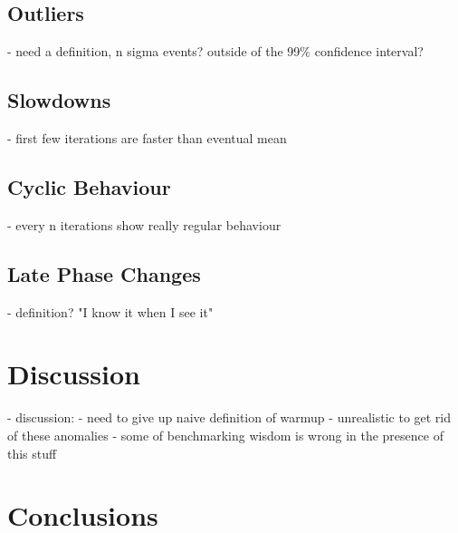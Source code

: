 \documentclass[10pt,preprint]{sigplanconf}
\begin{document}

\subsection{Outliers}
\label{sub:outliers}

 - need a definition, n sigma events? outside of the 99\% confidence interval?



\subsection{Slowdowns}
\label{sub:slowdowns}

 - first few iterations are faster than eventual mean



\subsection{Cyclic Behaviour}
\label{sub:cyclic}

  - every n iterations show really regular behaviour



\subsection{Late Phase Changes}
\label{sub:phase}

  - definition? "I know it when I see it"


\section{Discussion}
\label{sec:Discussion}

  - discussion:
    - need to give up naive definition of warmup
    - unrealistic to get rid of these anomalies
    - some of benchmarking wisdom is wrong in the presence of this stuff


\section{Conclusions}
\label{sec:conclusion}



\end{document}
